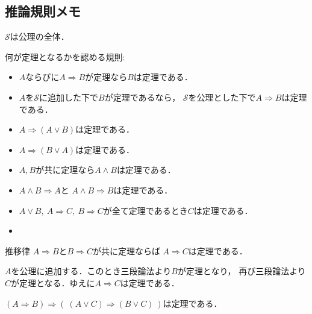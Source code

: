 \subsection{推論規則メモ}
	$\mathscr{S}$は公理の全体．
	\begin{screen}
		\begin{schema}[公理図式群A]
			何が定理となるかを認める規則:
			\begin{itemize}
				\item $A$ならびに$A \Longrightarrow B$が定理なら$B$は定理である．
				\item $A$を$\mathscr{S}$に追加した下で$B$が定理であるなら，
					$\mathscr{S}$を公理とした下で$A \Longrightarrow B$は定理である．
				\item $A \Longrightarrow (A \vee B)$は定理である．
				\item $A \Longrightarrow (B \vee A)$は定理である．
				\item $A,B$が共に定理なら$A \wedge B$は定理である．
				\item $A \wedge B \Longrightarrow A$と
					$A \wedge B \Longrightarrow B$は定理である．
				\item $A \vee B,\ A \Longrightarrow C,\ B \Longrightarrow C$が全て定理であるとき$C$は定理である．
				\item 
			\end{itemize}	
		\end{schema}
	\end{screen}
	
	\begin{itembox}[l]{推移律}
		$A \Longrightarrow B$と$B \Longrightarrow C$が共に定理ならば
		$A \Longrightarrow C$は定理である．
	\end{itembox}
	
	\begin{prf}
		$A$を公理に追加する．このとき三段論法より$B$が定理となり，
		再び三段論法より$C$が定理となる．ゆえに$A \Longrightarrow C$は定理である．
	\end{prf}
	
	\begin{itembox}[l]{}
		$(A \Longrightarrow B) \Longrightarrow 
		(\ (A \vee C) \Longrightarrow (B \vee C)\ )$は定理である．
	\end{itembox}
	
